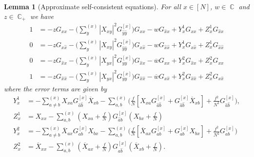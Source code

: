 \documentclass[10pt,a4paper]{amsart}
\DeclareMathOperator{\CC}{\mathbb{C}}
\newtheorem{lemma}{Lemma}[section]
\numberwithin{equation}{section}
\newcommand*\barr[1]{\overline{#1}}
\newcommand*\bset[1]{[#1]}
\newcommand*\ubarr[1]{{\widehat{#1}}}
\begin{document}
	\begin{lemma}[Approximate self-consistent equations]\label{lem:ASCEq}
		For all $x\in[N]$, $w \in \CC$ and $z \in \CC_+$ we have
		\begin{align*}
			1 &= -z G_{xx} - \bigg(\sum_{y}^{(x)} |X_{xy}|^{2}G^{\bset{x}}_{\ubarr{y}\ubarr{y}}\bigg) G_{xx} - w G_{ \ubarr{x}x}+ Y^1_{x} G_{xx} + Z^{1}_{x}G_{ \ubarr{x}x}\\
			0 &= -z G_{x\ubarr{x}} - \bigg(\sum_{y}^{(x)} |X_{xy}|^{2}G^{\bset{x}}_{\ubarr{y}\ubarr{y}}\bigg) G_{x\ubarr{x}} - w G_{ \ubarr{x}\ubarr{x}} + Y^1_{x} G_{x\ubarr{x}} + Z^{1}_{x}G_{ \ubarr{x}\ubarr{x}}\\
			0 &=  -z G_{\ubarr{x}x} - \bigg(\sum_{y}^{(x)} |X_{yx}|^{2}G^{\bset{x}}_{yy}\bigg) G_{\ubarr{x}x} -\barr{w} G_{xx} + Y^2_{x} G_{\ubarr{x}x} + Z^{2}_{x}G_{ xx}\\
			1 &=  -z G_{\ubarr{x}\ubarr{x}} - \bigg(\sum_{y}^{(x)} |X_{yx}|^{2}G^{\bset{x}}_{yy}\bigg) G_{\ubarr{x}\ubarr{x}} -\barr{w} G_{x\ubarr{x}} + Y^2_{x} G_{\ubarr{x}\ubarr{x}} + Z^{2}_{x}G_{ x\ubarr{x}}
		\end{align*}
		where the error terms are given by
		\begin{align*}
			Y_{x}^1 &= - \sum_{a \neq b}^{(x)} X_{xa} G^{\bset{x}}_{\ubarr{a}\ubarr{b}} \barr{X}_{xb}  - \sum_{a,b}^{(x)} \biggl(\frac{f}{N}\left[X_{xa} G_{\ubarr{a}\ubarr{b}}^{\bset{x}} + G_{\ubarr{a}\ubarr{b}}^{\bset{x}} \barr{X}_{xb} \right] + \frac{f^2}{N^2}G_{\ubarr{a}\ubarr{b}}^{\bset{x}}\biggr) ,\\
			Z_x^1 &=X_{xx} - \sum_{a,b}^{(x)} \left(X_{xa} + \frac{f}{N} \right) G_{\ubarr{a}b}^{\bset{x}} \left(X_{bx} + \frac{f}{N}\right)\\
			Y_{x}^2 &= - \sum_{a\neq b}^{(x)} \barr{X}_{ax} G_{ab}^{\bset{x}}X_{bx} - \sum_{a,b}^{(x)} \biggl(\frac{f}{N}\left[\barr{X}_{ax} G_{ab}^{\bset{x}} + G_{ab}^{\bset{x}} X_{bx} \right] + \frac{f^2}{N^2}G_{ab}^{\bset{x}}\biggr) \\
			Z_x^2 &= \barr{X}_{xx} - \sum_{a,b}^{(x)}\left(\barr{X}_{ax} + \frac{f}{N} \right) G_{a\ubarr{b}}^{\bset{x}} \left(\barr{X}_{xb} + \frac{f}{N}\right).
		\end{align*}
	\end{lemma}
	
\end{document}
